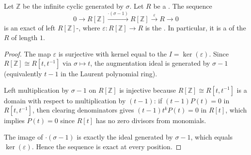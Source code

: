\begin{lemma} \label{lemma:group_ring_of_infinite_cyclic_group_has_length_one_free_resolution}
    Let $\mathbb{Z}$ be the infinite cyclic  generated by $\sigma$. Let $R$ be a . The sequence
    $$0 \to R[\mathbb{Z}] \xrightarrow{\cdot(\sigma-1)} R[\mathbb{Z}] \xrightarrow{\varepsilon} R \to 0$$
    is an exact  of  left $R[\mathbb{Z}]$-, where $\varepsilon: R[\mathbb{Z}] \to R$ is the . In particular, it is a  of the  $R$ of length $1$.
\end{lemma}
\begin{proof}
    The map $\varepsilon$ is surjective with kernel equal to the  $I = \ker(\varepsilon)$. Since $R[\mathbb{Z}] \cong R[t, t^{-1}]$ via $\sigma \mapsto t$, the augmentation ideal is generated by $\sigma - 1$ (equivalently $t-1$ in the Laurent polynomial ring).

    Left multiplication by $\sigma-1$ on $R[\mathbb{Z}]$ is injective because $R[\mathbb{Z}] \cong R[t, t^{-1}]$ is a domain with respect to multiplication by $(t-1)$: if $(t-1)P(t) = 0$ in $R[t, t^{-1}]$, then clearing denominators gives $(t-1)t^k P(t) = 0$ in $R[t]$, which implies $P(t) = 0$ since $R[t]$ has no zero divisors from monomials.

    The image of $\cdot(\sigma-1)$ is exactly the ideal generated by $\sigma-1$, which equals $\ker(\varepsilon)$. Hence the sequence is exact at every position.
\end{proof}
